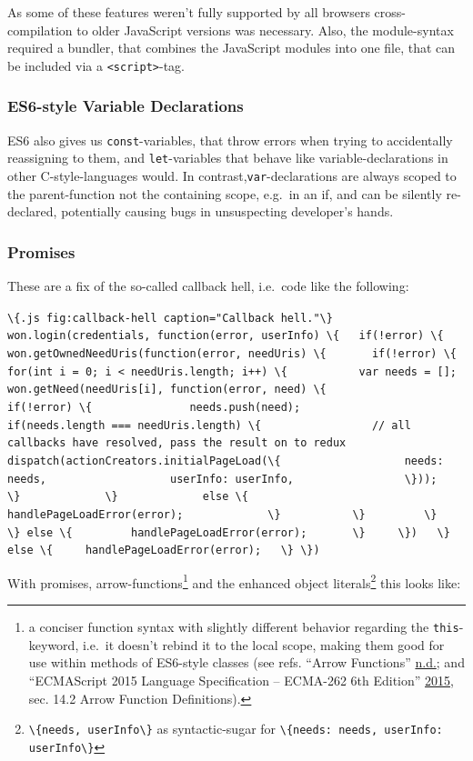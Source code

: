 \documentclass[a4paper,,tablecaptionabove]{scrbook}
\newcommand{\passthrough}[1]{#1}
\begin{document}
As some of these features weren't fully supported by all browsers
cross-compilation to older JavaScript versions was necessary. Also, the
module-syntax required a bundler, that combines the JavaScript modules
into one file, that can be included via a
\passthrough{\lstinline!<script>!}-tag.

\hypertarget{es6-style-variable-declarations}{%
\subsubsection{ES6-style Variable
Declarations}\label{es6-style-variable-declarations}}

ES6 also gives us \passthrough{\lstinline!const!}-variables, that throw
errors when trying to accidentally reassigning to them, and
\passthrough{\lstinline!let!}-variables that behave like
variable-declarations in other C-style-languages would. In
contrast,\passthrough{\lstinline!var!}-declarations are always scoped to
the parent-function not the containing scope, e.g.~in an if, and can be
silently re-declared, potentially causing bugs in unsuspecting
developer's hands.

\hypertarget{promises}{%
\subsubsection{Promises}\label{promises}}

These are a fix of the so-called callback hell, i.e.~code like the
following:

\passthrough{\lstinline'\{.js fig:callback-hell caption="Callback hell."\} won.login(credentials, function(error, userInfo) \{   if(!error) \{     won.getOwnedNeedUris(function(error, needUris) \{       if(!error) \{         for(int i = 0; i < needUris.length; i++) \{           var needs = [];           won.getNeed(needUris[i], function(error, need) \{             if(!error) \{               needs.push(need);               if(needs.length === needUris.length) \{                 // all callbacks have resolved, pass the result on to redux                 dispatch(actionCreators.initialPageLoad(\{                   needs: needs,                   userInfo: userInfo,                 \}));               \}             \}             else \{               handlePageLoadError(error);             \}           \}         \}       \} else \{         handlePageLoadError(error);       \}     \})   \} else \{     handlePageLoadError(error);   \} \})'}

With promises, arrow-functions\footnote{a conciser function syntax with
  slightly different behavior regarding the
  \passthrough{\lstinline!this!}-keyword, i.e.~it doesn't rebind it to
  the local scope, making them good for use within methods of ES6-style
  classes (see refs. ``Arrow Functions''
  \protect\hyperlink{ref-Arrowfunctions}{n.d.}; and ``ECMAScript 2015
  Language Specification -- ECMA-262 6th Edition''
  \protect\hyperlink{ref-ECMAScript2015Language2015}{2015}, sec. 14.2
  Arrow Function Definitions).} and the enhanced object
literals\footnote{\passthrough{\lstinline!\{needs, userInfo\}!} as
  syntactic-sugar for
  \passthrough{\lstinline!\{needs: needs, userInfo: userInfo\}!}} this
looks like:
\end{document}
